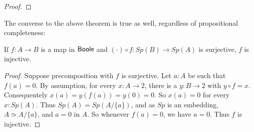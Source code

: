 \begin{proof}
%
%
\end{proof}  
The converse to the above theorem is true as well, regardless of propositional completeness:
\begin{lemma}
If $f:A\to B$ is a map in $\mathsf{Boole}$ and $(\cdot) \circ f :Sp(B) \to Sp(A)$ is surjective, 
$f$ is injective. 
\end{lemma}
\begin{proof}
  Suppose precomposition with $f$ is surjective. 
  Let $a:A$ be such that $f(a)= 0$. 
  By assumption, for every $x:A\to 2$, there is a $y:B\to 2$ with $y\circ f = x$. 
  Consequentely $x(a) = y(f(a)) = y(0) = 0$. 
  So $x(a) = 0$ for every $x:Sp(A)$. 
  Thus $Sp(A) = Sp(A/\{a\})$, and as $Sp$ is an embedding, 
  $A \simeq A/\{a\}$, and $a = 0$ in $A$. 
  So whenever $f(a) = 0$, we have $a=0$. Thus $f$ is injective. 
\end{proof}
